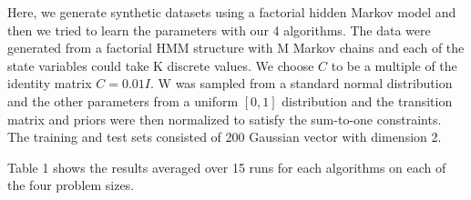 \documentclass[10pt,a4paper]{report}
\begin{document}
	


Here, we generate synthetic datasets using a factorial hidden Markov model and then we tried to learn the parameters with our 4 algorithms. The data were generated from a factorial HMM structure with M Markov chains and each of the state variables could take K discrete values. We choose $C$ to be a multiple of the identity matrix $C = 0.01 I$. W was sampled from a standard normal distribution and the other parameters from a uniform $[0,1]$ distribution and the transition matrix and priors were then normalized to satisfy the sum-to-one constraints. The training and test sets consisted of 200 Gaussian vector with dimension 2. 

Table 1 shows the results averaged over 15 runs for each algorithms on each of the four problem sizes. 
\end{document}
